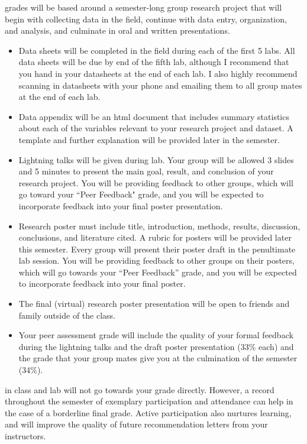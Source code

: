 \documentclass{tufte-handout}
\begin{document}
\begin{fullwidth}

 grades will be based around a semester-long group research project that will begin with collecting data in the field, continue with data entry, organization, and analysis, and culminate in oral and written presentations. 

\begin{itemize}
\item Data sheets will be completed in the field during each of the first 5 labs. All data sheets will be due by end of the fifth lab, although I recommend that you hand in your datasheets at the end of each lab. I also highly recommend scanning in datasheets with your phone and emailing them to all group mates at the end of each lab. 
\item Data appendix will be an html document that includes summary statistics about each of the variables relevant to your research project and dataset. A template and further explanation will be provided later in the semester. 
\item Lightning talks will be given during lab. Your group will be allowed 3 slides and 5 minutes to present the main goal, result, and conclusion of your research project. You will be providing feedback to other groups, which will go toward your ``Peer Feedback" grade, and you will be expected to incorporate feedback into your final poster presentation.
\item Research poster must include title, introduction, methods, results, discussion, conclusions, and literature cited. A rubric for posters will be provided later this semester. Every group will present their poster draft in the penultimate lab session. You will be providing feedback to other groups on their posters, which will go towards your ``Peer Feedback'' grade, and you will be expected to incorporate feedback into your final poster. 
\item The final (virtual) research poster presentation will be open to friends and family outside of the class.
\item Your peer assessment grade will include the quality of your formal feedback during the lightning talks and the draft poster presentation (33\% each) and the grade that your group mates give you at the culmination of the semester (34\%). 
\end{itemize}

 in class and lab will not go towards your grade directly. However, a record throughout the semester of exemplary participation and attendance can help in the case of a borderline final grade. Active participation also nurtures learning, and will improve the quality of future recommendation letters from your instructors.  

\end{fullwidth}
\end{document}
